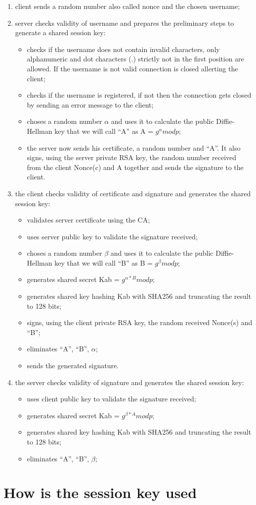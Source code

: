 \begin{enumerate}
	\item client sends a random number also called nonce and the chosen username;
	\item server checks validity of username and prepares the preliminary steps to generate a shared session key:
	\begin{itemize}
		\item checks if the username does not contain invalid characters, only alphanumeric and dot characters (.) strictly not in the first position are allowed. If the username is not valid connection is closed allerting the client;
		\item checks if the username is registered, if not then the connection gets closed by sending an error message to the client;
		\item choses a random number \(\alpha\) and uses it to calculate the public Diffie-Hellman key that we will call ``A'' as A = \(g^\alpha mod p \);
		\item the server now sends his certificate, a random number and ``A''. It also signs, using the server private RSA key, the random number received from the client Nonce(c) and A together and sends the signature to the client.
	\end{itemize}
	\item the client checks validity of certificate and signature and generates the shared session key:
	\begin{itemize}
		\item validates server certificate using the CA;
		\item uses server public key to validate the signature received;
		\item choses a random number \(\beta\) and uses it to calculate the public Diffie-Hellman key that we will call ``B'' as B = \(g^\beta mod p \);
		\item generates shared secret Kab = \(g^{\alpha*B} mod p\);
		\item generates shared key hashing Kab with SHA256 and truncating the result to 128 bits;
		\item signs, using the client private RSA key, the random received Nonce(s) and ``B'';
		\item eliminates ``A'', ``B'', \(\alpha\);
		\item sends the generated signature. 
	\end{itemize}
	\item the server checks validity of signature and generates the shared session key:
	\begin{itemize}
		\item uses client public key to validate the signature received;
		\item generates shared secret Kab = \(g^{\beta*A} mod p\);
		\item generates shared key hashing Kab with SHA256 and truncating the result to 128 bits;
		\item eliminates ``A'', ``B'', \(\beta\);
	\end{itemize}	 
\end{enumerate}

\section{How is the session key used}

